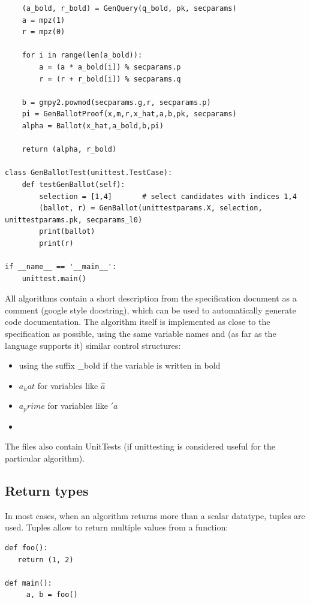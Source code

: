 \documentclass[a4paper,12pt]{report}
\theoremstyle{definition}
\begin{document}
\begin{verbatim}
    (a_bold, r_bold) = GenQuery(q_bold, pk, secparams)
    a = mpz(1)
    r = mpz(0)

    for i in range(len(a_bold)):
        a = (a * a_bold[i]) % secparams.p
        r = (r + r_bold[i]) % secparams.q

    b = gmpy2.powmod(secparams.g,r, secparams.p)
    pi = GenBallotProof(x,m,r,x_hat,a,b,pk, secparams)
    alpha = Ballot(x_hat,a_bold,b,pi)

    return (alpha, r_bold)

class GenBallotTest(unittest.TestCase):
    def testGenBallot(self):
        selection = [1,4]       # select candidates with indices 1,4
        (ballot, r) = GenBallot(unittestparams.X, selection, unittestparams.pk, secparams_l0)
        print(ballot)
        print(r)

if __name__ == '__main__':
    unittest.main()

\end{verbatim}
All algorithms contain a short description from the specification document as a comment (google style docstring), which can be used to automatically generate code documentation. The algorithm itself is implemented as close to the specification as possible, using the same variable names and (as far as the language supports it) similar control structures:

\begin{itemize}
	\item using the suffix \_bold if the variable is written in bold
	\item $a_hat$ for variables like $\hat{a}$
	\item $a_prime$ for variables like $\prime{a}$
	\item 
\end{itemize}

The files also contain UnitTests (if unittesting is considered useful for the particular algorithm).

\subsection{Return types}
In most cases, when an algorithm returns more than a scalar datatype, tuples are used. Tuples allow to return multiple values from a function:
\begin{verbatim}
def foo():
   return (1, 2)
	
def main():
	 a, b = foo()
\end{verbatim}
\end{document}
